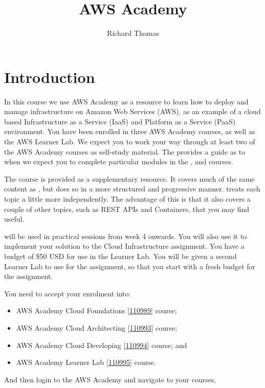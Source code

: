 \title{AWS Academy}
\author{Richard Thomas}
\date{}

\maketitle

\section{Introduction}
In this course we use AWS Academy as a resource to learn how to deploy and manage infrastructure on Amazon Web Services (AWS),
as an example of a cloud based Infrastructure as a Service (IaaS) and Platform as a Service (PaaS) environment.
You have been enrolled in three AWS Academy courses, as well as the AWS Learner Lab.
We expect you to work your way through at least two of the AWS Academy courses as self-study material.
The  provides a guide as to when we expect you to complete particular modules in the
,
and  courses.

The  course is provided as a supplementary resource.
It covers much of the same content as , 
but  does so in a more structured and progressive manner.
 treats each topic a little more independently.
The advantage of this is that it also covers a couple of other topics, such as REST APIs and Containers, that you may find useful.

 will be used in practical sessions from week 4 onwards.
You will also use it to implement your solution to the Cloud Infrastructure assignment.
You have a budget of \$50 USD for use in the Learner Lab.
You will be given a second Learner Lab to use for the assignment,
so that you start with a fresh budget for the assignment.

You need to accept your enrolment into:
\begin{itemize}
    \item AWS Academy Cloud Foundations [\href{https://awsacademy.instructure.com/courses/110989}{110989}] course;
    \item AWS Academy Cloud Architecting [\href{https://awsacademy.instructure.com/courses/110993}{110993}] course;
    \item AWS Academy Cloud Developing [\href{https://awsacademy.instructure.com/courses/110994}{110994}] course; and
    \item AWS Academy Learner Lab [\href{https://awsacademy.instructure.com/courses/110995}{110995}] course.
\end{itemize}
And then login to the AWS Academy and navigate to your courses.

